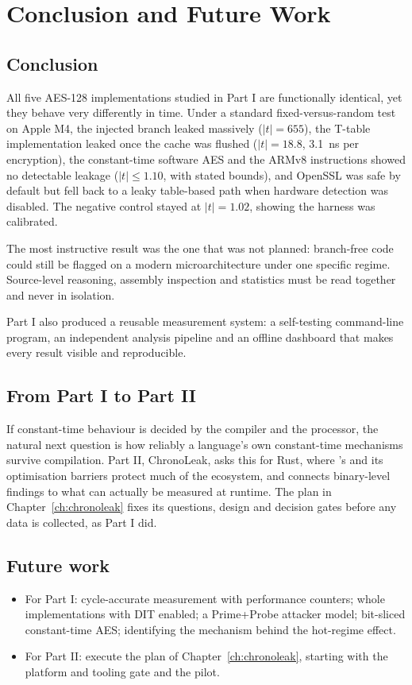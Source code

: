 \chapter{Conclusion and Future Work}
\label{ch:concl}

\section{Conclusion}

All five AES-128 implementations studied in Part I are functionally identical, yet they behave very differently in time. Under a standard fixed-versus-random test on Apple M4, the injected branch leaked massively ($\lvert t\rvert = 655$), the T-table implementation leaked once the cache was flushed ($\lvert t\rvert = 18.8$, 3.1~ns per encryption), the constant-time software AES and the ARMv8 instructions showed no detectable leakage ($\lvert t\rvert \le 1.10$, with stated bounds), and OpenSSL was safe by default but fell back to a leaky table-based path when hardware detection was disabled. The negative control stayed at $\lvert t\rvert = 1.02$, showing the harness was calibrated.

The most instructive result was the one that was not planned: branch-free code could still be flagged on a modern microarchitecture under one specific regime. Source-level reasoning, assembly inspection and statistics must be read together and never in isolation.

Part I also produced a reusable measurement system: a self-testing command-line program, an independent analysis pipeline and an offline dashboard that makes every result visible and reproducible.

\section{From Part I to Part II}

If constant-time behaviour is decided by the compiler and the processor, the natural next question is how reliably a language's own constant-time mechanisms survive compilation. Part II, ChronoLeak, asks this for Rust, where 's  and its optimisation barriers protect much of the ecosystem, and connects binary-level findings to what can actually be measured at runtime. The plan in Chapter~\ref{ch:chronoleak} fixes its questions, design and decision gates before any data is collected, as Part I did.

\section{Future work}

\begin{itemize}
  \item For Part I: cycle-accurate measurement with performance counters; whole implementations with DIT enabled; a Prime+Probe attacker model; bit-sliced constant-time AES; identifying the mechanism behind the hot-regime effect.
  \item For Part II: execute the plan of Chapter~\ref{ch:chronoleak}, starting with the platform and tooling gate and the  pilot.
\end{itemize}
